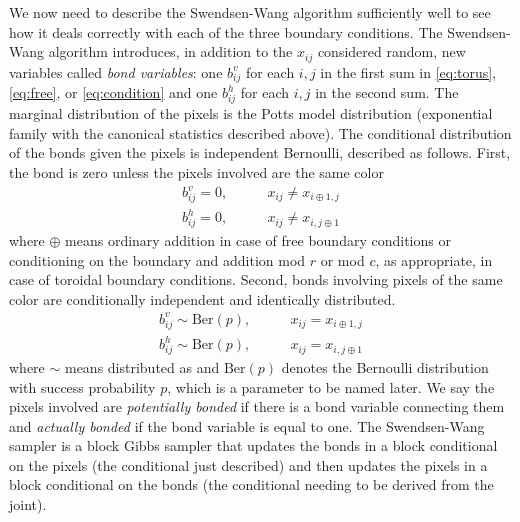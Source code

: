 \documentclass[11pt]{article}
\begin{document}
We now need to describe the Swendsen-Wang algorithm sufficiently well to
see how it deals correctly with each of the three boundary conditions.
The Swendsen-Wang algorithm introduces, in addition to the $x_{i j}$ considered
random, new variables called \emph{bond variables}: one $b^v_{i j}$
for each $i, j$ in
the first sum in \eqref{eq:torus}, \eqref{eq:free}, or \eqref{eq:condition}
and one $b^h_{i j}$ for each $i, j$ in the second sum.  The marginal
distribution of the pixels is the Potts model distribution (exponential
family with the canonical statistics described above).  The conditional
distribution of the bonds given the pixels is independent Bernoulli, described
as follows.  First, the bond is zero unless the pixels involved are the
same color
\begin{align*}
   b^v_{i j} = 0, & \qquad x_{i j} \neq x_{i \oplus 1, j}
   \\
   b^h_{i j} = 0, & \qquad x_{i j} \neq x_{i, j \oplus 1}
\end{align*}
where $\oplus$ means ordinary addition in case of free boundary conditions
or conditioning on the boundary and addition mod $r$ or mod $c$, as
appropriate, in case of toroidal boundary conditions.  Second, bonds
involving pixels of the same color are conditionally independent and
identically distributed.
\begin{align*}
   b^v_{i j} \sim \text{Ber}(p), & \qquad x_{i j} = x_{i \oplus 1, j}
   \\
   b^h_{i j} \sim \text{Ber}(p), & \qquad x_{i j} = x_{i, j \oplus 1}
\end{align*}
where $\sim$ means distributed as and $\text{Ber}(p)$ denotes the Bernoulli
distribution with success probability $p$, which is a parameter to be named
later.  We say the pixels involved are \emph{potentially bonded} if there
is a bond variable connecting them and \emph{actually bonded} if the bond
variable is equal to one.  The Swendsen-Wang sampler is
a block Gibbs sampler that updates the
bonds in a block conditional on the pixels (the conditional just described)
and then updates the pixels in a block conditional on the bonds (the
conditional needing to be derived from the joint).
\end{document}
